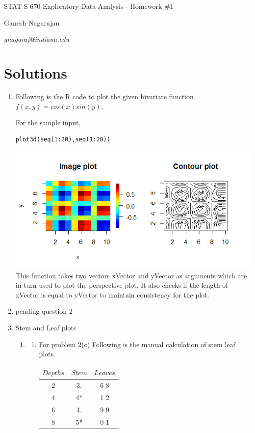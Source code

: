 \documentclass{article}
\begin{document}
\lstset{language=R}
\centerline{\sc \large STAT S 670 Exploratory Data Analysis - Homework \#1}
\vspace{.5pc}
\centerline{\sc Ganesh Nagarajan}
\centerline{\it gnagaraj@indiana.edu}
\vspace{2pc}
\section{Solutions}
\begin{enumerate}
\item Following is the R code to plot the given bivariate function $f(x,y)=cos(x)sin(y)$,

For the sample input,
\begin{lstlisting}
plot3d(seq(1:20),seq(1:20))
\end{lstlisting}
\includegraphics[scale=0.5]{perspplot1}
\\This function takes two vectors xVector and yVector as arguments which are in turn used to plot the perspective plot. It also checks if the length of xVector is equal to yVector to maintain consistency for the plot.
\item pending question 2
\item Stem and Leaf plots
\begin{enumerate}
\item
\begin{enumerate}
\item
For problem 2(c) Following is the manual calculation of stem leaf plots.
\begin{center}
\begin{tabular}{|c  |c  |c|}
$Depths$ & $Stem$ & $Leaves$ \\ \hline
2&	3.&	6 8\\
4&4*&1 2\\
6&4.&9 9\\
8&5*&0 1\\

\end{tabular}
\end{center}
\end{enumerate}
\end{enumerate}
\end{enumerate}
\end{document}
